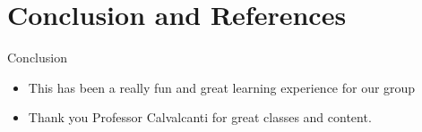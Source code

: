 \section{Conclusion and References}
    
    \frame{\sectionpage}
    
    \begin{frame}{Conclusion}
         	\begin{itemize}
         	\item This has been a really fun and great learning experience for our group
         	\pause
         	\item Thank you Professor Calvalcanti for great classes and content.
         \end{itemize}
    \end{frame}